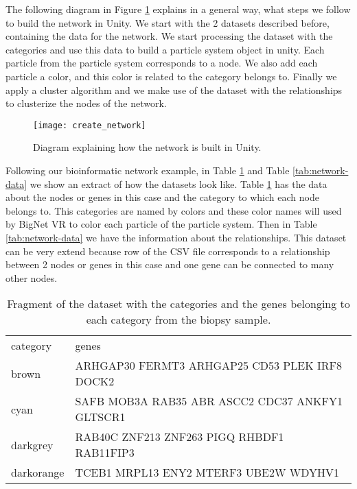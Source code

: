 The following diagram in Figure \ref{fig:create_network} explains in a general way, what steps we follow to build the network in Unity. We start with the 2 datasets described before, containing the data for the network. We start processing the dataset with the categories and use this data to build a particle system object in unity. Each particle from the particle system corresponds to a node. We also add each particle a color, and this color is related to the category belongs to. Finally we apply a cluster algorithm and we make use of the dataset with the relationships to clusterize the nodes of the network.

\begin{figure}[h!]
    \centering%
    \texttt{[image: create\_network]}
    \caption{Diagram explaining how the network is built in Unity.}
    \label{fig:create_network}
\end{figure}%

Following our bioinformatic network example, in Table \ref{tab:categories-data} and Table \ref{tab:network-data} we show an extract of how the datasets look like. Table \ref{tab:categories-data} has the data about the nodes or genes in this case and the category to which each node belongs to. This categories are named by colors and these color names will used by BigNet VR to color each particle of the particle system. Then in Table \ref{tab:network-data} we have the information about the relationships. This dataset can be very extend because row of the CSV file corresponds to a relationship between 2 nodes or genes in this case and one gene can be connected to many other nodes.

\begin{table}[h!]
\centering
\begin{tabular}{ll}
\hline
category & genes          \\
brown   & ARHGAP30 FERMT3 ARHGAP25 CD53 PLEK IRF8 DOCK2\\
cyan  & SAFB MOB3A RAB35 ABR ASCC2 CDC37 ANKFY1 GLTSCR1\\
darkgrey  & RAB40C ZNF213 ZNF263 PIGQ RHBDF1 RAB11FIP3\\
darkorange  & TCEB1 MRPL13 ENY2 MTERF3 UBE2W WDYHV1\\
\hline
\end{tabular}
\caption{Fragment of the dataset with the categories and the genes belonging to each category from the biopsy sample.}
\label{tab:categories-data}
\end{table}

